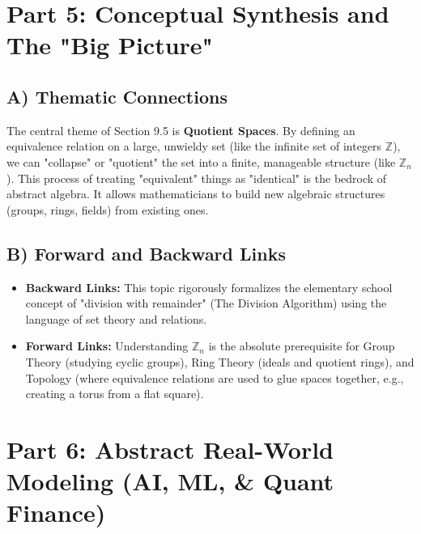 \documentclass[11pt, a4paper]{article}
\theoremstyle{definition}
\theoremstyle{remark}
\begin{document}
\newpage
\section{Part 5: Conceptual Synthesis and The "Big Picture"}

\subsection{A) Thematic Connections}
The central theme of Section 9.5 is \textbf{Quotient Spaces}. By defining an equivalence relation on a large, unwieldy set (like the infinite set of integers $\mathbb{Z}$), we can "collapse" or "quotient" the set into a finite, manageable structure (like $\mathbb{Z}_n$). This process of treating "equivalent" things as "identical" is the bedrock of abstract algebra. It allows mathematicians to build new algebraic structures (groups, rings, fields) from existing ones.

\subsection{B) Forward and Backward Links}
\begin{itemize}
    \item \textbf{Backward Links:} This topic rigorously formalizes the elementary school concept of "division with remainder" (The Division Algorithm) using the language of set theory and relations.
    \item \textbf{Forward Links:} Understanding $\mathbb{Z}_n$ is the absolute prerequisite for Group Theory (studying cyclic groups), Ring Theory (ideals and quotient rings), and Topology (where equivalence relations are used to glue spaces together, e.g., creating a torus from a flat square).
\end{itemize}

\section{Part 6: Abstract Real-World Modeling (AI, ML, \& Quant Finance)}
\end{document}
